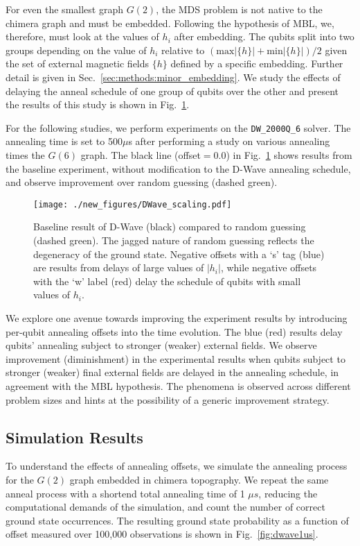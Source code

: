 \documentclass[prd,twocolumn,tightenlines,preprintnumbers,showpacs,superscriptaddress,notitlepage,nofootinbib,eqsecnum,floatfix,longbibliography,aps,10pt]{revtex4-2}
\begin{document}
For even the smallest graph $G(2)$, the MDS problem is not native to the chimera graph and must be embedded. Following the hypothesis of MBL, we, therefore, must look at the values of $h_i$ after embedding. The qubits split into two groups depending on the value of $h_i$ relative to $(\textrm{max}|\{h\}| + \textrm{min}|\{h\}|) / 2$ given the set of external magnetic fields $\{h\}$ defined by a specific embedding. Further detail is given in Sec.~\ref{sec:methods:minor_embedding}. We study the effects of delaying the anneal schedule of one group of qubits over the other and present the results of this study is shown in Fig.~\ref{fig:baseline}.

For the following studies, we perform experiments on the \texttt{DW\_2000Q\_6} solver. The annealing time is set to 500$\mu$s after performing a study on various annealing times the $G(6)$ graph. The black line (offset$=0.0$) in Fig.~\ref{fig:baseline} shows results from the baseline experiment, without modification to the D-Wave annealing schedule, and observe improvement over random guessing (dashed green).

\begin{figure}
	\centering
	\texttt{[image: ./new\_figures/DWave\_scaling.pdf]}
	\caption{Baseline result of D-Wave (black) compared to random guessing (dashed green). The jagged nature of random guessing reflects the degeneracy of the ground state. Negative offsets with a `s' tag (blue) are results from delays of large values of $|h_i|$, while negative offsets with the `w' label (red) delay the schedule of qubits with small values of $h_i$.}
	\label{fig:baseline}
\end{figure}

We explore one avenue towards improving the experiment results by introducing per-qubit annealing offsets into the time evolution.
The blue (red) results delay qubits' annealing subject to stronger (weaker) external fields. We observe improvement (diminishment) in the experimental results when qubits subject to stronger (weaker) final external fields are delayed in the annealing schedule, in agreement with the MBL hypothesis. The phenomena is observed across different problem sizes and hints at the possibility of a generic improvement strategy.


\subsection{Simulation Results}
\label{sec:results:simulation}
To understand the effects of annealing offsets, we simulate the annealing process for the $G(2)$ graph embedded in chimera topography.
We repeat the same anneal process with a shortend total annealing time of 1 $\mu s$, reducing the computational demands of the simulation, and count the number of correct ground state occurrences.
The resulting ground state probability as a function of offset measured over 100,000 observations is shown in Fig.~\ref{fig:dwave1us}.
\end{document}
